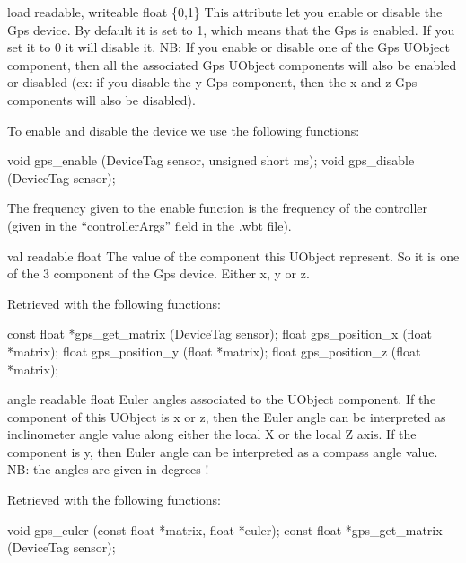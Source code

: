 \noindent
\begin{description}
\begin{attribute}{load}
  {readable, writeable}
  {float}
  {\{0,1\}}
  This attribute let you enable or disable the Gps
  device.  By default it is set to 1, which means that the Gps is
  enabled. If you set it to 0 it will disable it. NB: If you enable or
  disable one of the Gps UObject component, then all the associated
  Gps UObject components will also be enabled or disabled (ex: if you
  disable the y Gps component, then the x and z Gps components will
  also be disabled).

  To enable and disable the device we use the following \webots
  functions:

\begin{cxx}
void gps_enable  (DeviceTag sensor, unsigned short ms);
void gps_disable (DeviceTag sensor);
\end{cxx}

The frequency given to the enable function is the frequency of the
\urbi controller (given in the ``controllerArgs'' field in the .wbt
file).
\end{attribute}

\begin{attribute}{val}
  {readable}
  {float}
  {}
  The value of the component this UObject represent. So it
 is one of the 3 component of the \webots Gps device. Either x, y or z.


 Retrieved with the following \webots functions:


\begin{cxx}
const float *gps_get_matrix  (DeviceTag sensor);
float gps_position_x (float *matrix);
float gps_position_y (float *matrix);
float gps_position_z (float *matrix);
\end{cxx}
\end{attribute}

\begin{attribute}{angle}
  {readable}
  {float}
  {}
  Euler angles associated to the UObject component. If the
 component of this UObject is x or z, then the Euler angle can be
 interpreted as inclinometer angle value along either the local X or
 the local Z axis. If the component is y, then Euler angle can be
 interpreted as a compass angle value. NB: the angles are given in
 degrees !


          Retrieved with the following \webots functions:


\begin{cxx}
void gps_euler (const float *matrix, float *euler);
const float *gps_get_matrix  (DeviceTag sensor);
\end{cxx}
\end{attribute}

\end{description}

